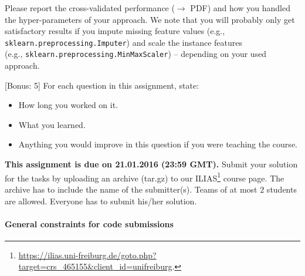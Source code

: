 \documentclass{exam}
\begin{document}
\begin{questions}
Please report the cross-validated performance ($\to$ PDF)
and how you handled the hyper-parameters of your approach.
We note that you will probably only get satisfactory results if you impute missing feature values (e.g., \texttt{sklearn.preprocessing.Imputer})
and scale the instance features\\ (e.g., \texttt{sklearn.preprocessing.MinMaxScaler}) -- depending on your used approach.

[Bonus: 5]
For each question in this assignment, state:
\begin{itemize}
	\item How long you worked on it.
	\item What you learned.
	\item Anything you would improve in this question if you were teaching the course.
\end{itemize}

\end{questions}




\noindent
{\bf This assignment is due on 21.01.2016 (23:59 GMT).} Submit your solution for the tasks by uploading an archive (tar.gz) to our ILIAS\footnote{ \url{https://ilias.uni-freiburg.de/goto.php?target=crs_465155&client_id=unifreiburg}.} course page. The archive has to include the name of the submitter(s). Teams of at most $2$ students are allowed. Everyone has to submit his/her solution. 

\bigskip
\paragraph{General constraints for code submissions}
\end{document}
